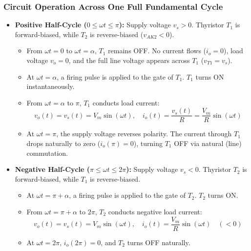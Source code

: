 \documentclass[11pt,a4paper]{article}
\begin{document}
\subsubsection{Circuit Operation Across One Full Fundamental Cycle}
\begin{itemize}[leftmargin=*]
  \item \textbf{Positive Half-Cycle ($0 \le \omega t \le \pi$):} Supply voltage $v_s > 0$. Thyristor $T_1$ is forward-biased, while $T_2$ is reverse-biased ($v_{AK2} < 0$).
  \begin{itemize}
    \item From $\omega t = 0$ to $\omega t = \alpha$, $T_1$ remains OFF. No current flows ($i_o = 0$), load voltage $v_o = 0$, and the full line voltage appears across $T_1$ ($v_{T1} = v_s$).
    \item At $\omega t = \alpha$, a firing pulse is applied to the gate of $T_1$. $T_1$ turns ON instantaneously.
    \item From $\omega t = \alpha$ to $\pi$, $T_1$ conducts load current:
    \begin{equation}
    v_o(t) = v_s(t) = V_m \sin(\omega t), \quad i_o(t) = \frac{v_s(t)}{R} = \frac{V_m}{R}\sin(\omega t)
    \end{equation}
    \item At $\omega t = \pi$, the supply voltage reverses polarity. The current through $T_1$ drops naturally to zero ($i_o(\pi) = 0$), turning $T_1$ OFF via natural (line) commutation.
  \end{itemize}

  \item \textbf{Negative Half-Cycle ($\pi \le \omega t \le 2\pi$):} Supply voltage $v_s < 0$. Thyristor $T_2$ is forward-biased, while $T_1$ is reverse-biased.
  \begin{itemize}
    \item At $\omega t = \pi + \alpha$, a firing pulse is applied to the gate of $T_2$. $T_2$ turns ON.
    \item From $\omega t = \pi + \alpha$ to $2\pi$, $T_2$ conducts negative load current:
    \begin{equation}
    v_o(t) = v_s(t) = V_m \sin(\omega t), \quad i_o(t) = \frac{V_m}{R}\sin(\omega t) \quad (< 0)
    \end{equation}
    \item At $\omega t = 2\pi$, $i_o(2\pi) = 0$, and $T_2$ turns OFF naturally.
  \end{itemize}
\end{itemize}
\end{document}
